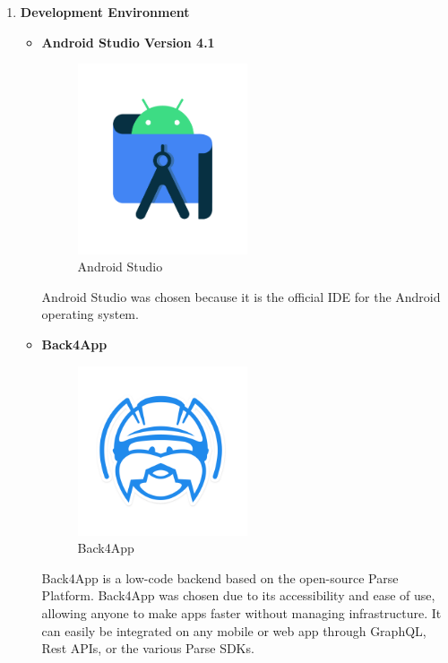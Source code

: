 \documentclass[conference]{IEEEtran}
\begin{document}
\begin{enumerate}
    \item \textbf{Development Environment} 
    \begin{itemize}
        \item \textbf{Android Studio Version 4.1} 
        \begin{figure}[htbp]
            \centerline{\includegraphics[width=50mm,scale=0.5]{img/logo/logo-android-studio.png}}
            \caption{Android Studio}
            \label{fig:androids-studio-logo}
        \end{figure}
        \newline
        Android Studio was chosen because it is the official IDE for the Android operating system.
        \newline
        \item \textbf{Back4App} 
        \begin{figure}[htbp]
            \centerline{\includegraphics[width=50mm,scale=0.5]{img/logo/logo-Back4app.png}}
            \caption{Back4App}
            \label{fig:back4app-logo}
        \end{figure}
        \newline
        Back4App is a low-code backend based on the open-source Parse Platform. Back4App was chosen due to its accessibility and ease of use, allowing anyone to make apps faster without managing infrastructure. It can easily be integrated on any mobile or web app through GraphQL, Rest APIs, or the various Parse SDKs.
        \newline

\end{itemize}
\end{enumerate}
\end{document}
